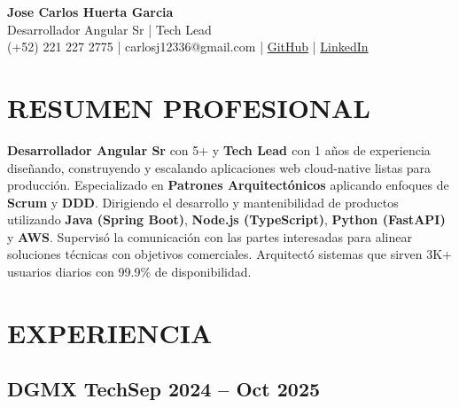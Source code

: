 \documentclass[a4paper,10pt]{article}
\newcommand{\kw}[1]{\textbf{\textcolor{keyword}{#1}}}
\begin{document}
\begin{center}
{\bfseries\LARGE Jose Carlos Huerta Garcia} \\
Desarrollador Angular Sr | Tech Lead \\
(+52) 221 227 2775 | carlosj12336@gmail.com | \href{https://github.com/jcarloshg}{GitHub} | \href{https://www.linkedin.com/in/jose-carlos-huerta-garcia-773952212}{LinkedIn}
\end{center}

\section*{RESUMEN PROFESIONAL}
\kw{Desarrollador Angular Sr} con 5+ y \kw{Tech Lead } con 1 años de experiencia diseñando, construyendo y escalando aplicaciones web cloud-native listas para producción. Especializado en \kw{Patrones Arquitectónicos} aplicando enfoques de \kw{Scrum} y \kw{DDD}. Dirigiendo el desarrollo y mantenibilidad de productos utilizando \kw{Java (Spring Boot)}, \kw{Node.js (TypeScript)}, \kw{Python (FastAPI)} y \kw{AWS}. Supervisó la comunicación con las partes interesadas para alinear soluciones técnicas con objetivos comerciales. Arquitectó sistemas que sirven 3K+ usuarios diarios con 99.9\% de disponibilidad.

\section*{EXPERIENCIA}

\subsection*{\small DGMX Tech\hfill\textbf{Sep 2024 -- Oct 2025}}
\end{document}
